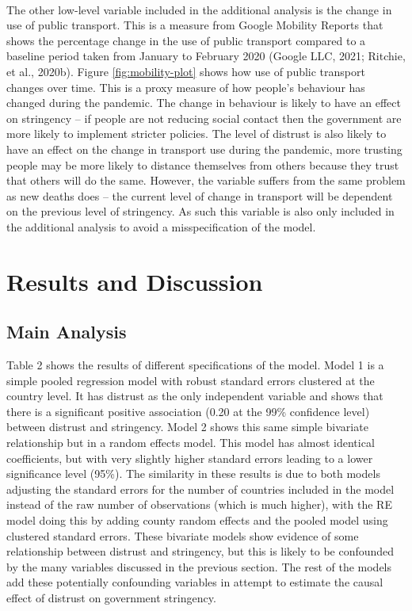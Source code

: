 \documentclass[
  12pt,
]{article}
\begin{document}
~\\
The other low-level variable included in the additional analysis is the change in use of public transport. This is a measure from Google Mobility Reports that shows the percentage change in the use of public transport compared to a baseline period taken from January to February 2020 (Google LLC, 2021; Ritchie, et al., 2020b). Figure \ref{fig:mobility-plot} shows how use of public transport changes over time. This is a proxy measure of how people's behaviour has changed during the pandemic. The change in behaviour is likely to have an effect on stringency -- if people are not reducing social contact then the government are more likely to implement stricter policies. The level of distrust is also likely to have an effect on the change in transport use during the pandemic, more trusting people may be more likely to distance themselves from others because they trust that others will do the same. However, the variable suffers from the same problem as new deaths does -- the current level of change in transport will be dependent on the previous level of stringency. As such this variable is also only included in the additional analysis to avoid a misspecification of the model.\\

\hypertarget{results-and-discussion}{%
\section{Results and Discussion}\label{results-and-discussion}}

\hypertarget{main-analysis}{%
\subsection{Main Analysis}\label{main-analysis}}

Table 2 shows the results of different specifications of the model. Model 1 is a simple pooled regression model with robust standard errors clustered at the country level. It has distrust as the only independent variable and shows that there is a significant positive association (0.20 at the 99\% confidence level) between distrust and stringency. Model 2 shows this same simple bivariate relationship but in a random effects model. This model has almost identical coefficients, but with very slightly higher standard errors leading to a lower significance level (95\%). The similarity in these results is due to both models adjusting the standard errors for the number of countries included in the model instead of the raw number of observations (which is much higher), with the RE model doing this by adding county random effects and the pooled model using clustered standard errors. These bivariate models show evidence of some relationship between distrust and stringency, but this is likely to be confounded by the many variables discussed in the previous section. The rest of the models add these potentially confounding variables in attempt to estimate the causal effect of distrust on government stringency.\\
~\\
\end{document}

